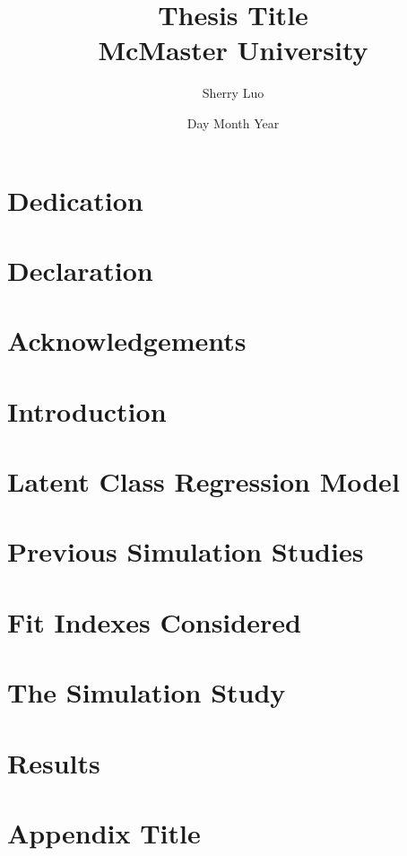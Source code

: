 \documentclass[12pt]{report}
\title{
    {Thesis Title}\\
    {\large McMaster University}\\
}
\author{Sherry Luo}
\date{Day Month Year}
\begin{document}
\maketitle


\chapter*{Dedication}

\chapter*{Declaration}

\chapter*{Acknowledgements}

\tableofcontents
\chapter{Introduction}





\chapter{Latent Class Regression Model}







 
\chapter{Previous Simulation Studies}



\chapter{Fit Indexes Considered}



\chapter{The Simulation Study}


\chapter{Results}







\appendix
\chapter{Appendix Title}
\end{document}
